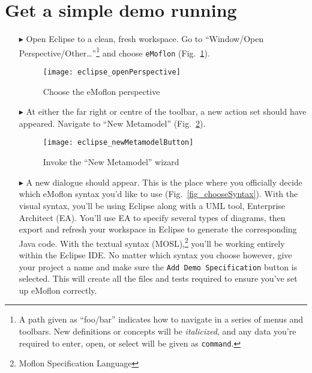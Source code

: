 \newpage
\genHeader

\section{Get a simple demo running}


\begin{itemize}
\hypertarget{simpleDemo common}{} 
\item[$\blacktriangleright$] Open Eclipse to a clean, fresh workspace. Go to ``Window/Open Perspective/Other\ldots''\footnote{A path given as ``foo/bar''
indicates how to navigate in a series of menus and toolbars. New definitions or concepts will be \emph{italicized}, and any data you're required to enter,
open, or select will be given as \texttt{command}.} and choose \texttt{eMoflon} (Fig.~\ref{fig_eclipse}).

\begin{figure}[htbp]
	\centering
  \texttt{[image: eclipse\_openPerspective]}
	\caption{Choose the eMoflon perspective}
	\label{fig_eclipse}
\end{figure} 

\item[$\blacktriangleright$] At either the far right or centre of the toolbar, a new action set should have appeared. Navigate to ``New Metamodel''
(Fig.~\ref{fig_eclipseNewMetamodelButton}).

\vspace{0.5cm}
\begin{figure}[htbp]
	\centering
  \texttt{[image: eclipse\_newMetamodelButton]}
	\caption{Invoke the ``New Metamodel'' wizard}
	\label{fig_eclipseNewMetamodelButton}
\end{figure}

\newpage

\item[$\blacktriangleright$] A new dialogue should appear. This is the place where you officially decide which eMoflon syntax you'd like to use
(Fig.~\ref{fig_chooseSyntax}). With the visual syntax, you'll be using Eclipse along with a UML tool, Enterprise Architect (EA). You'll use EA to specify
several types of diagrams, then export and refresh your workspace in Eclipse to generate the corresponding Java code. With the textual syntax
(MOSL),\footnote{Moflon Specification Language} you'll be working entirely within the Eclipse IDE. No matter which syntax you choose however, give your project
a name and make sure the \texttt{Add Demo Specification} button is selected. This will create all the files and tests required to ensure you've set up eMoflon
correctly.


\end{itemize}
